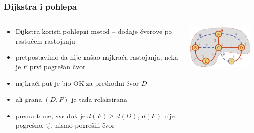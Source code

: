 \documentclass[compress]{beamer}
\begin{document}
\begin{frame}[fragile]
  \frametitle{Dijkstra i pohlepa}
  \begin{columns}
    \begin{column}[t]{7cm}
      \begin{itemize}
        \item Dijkstra koristi pohlepni metod -- dodaje čvorove po 
          rastućem rastojanju
        \item pretpostavimo da nije našao najkraća rastojanja; neka je 
          $F$ prvi pogrešan čvor
        \item najkraći put je bio OK za prethodni čvor $D$
        \item ali grana $(D,F)$ je tada relaksirana
        \item prema tome, sve dok je $d(F)\geq d(D)$, $d(F)$ nije
          pogrešno, tj. nismo pogrešili čvor
      \end{itemize}
    \end{column}
    \begin{column}[t]{5cm}
      \begin{center}
        \includegraphics[width=5cm]{asp-14-pic64.png}
      \end{center}
    \end{column}
  \end{columns}
\end{frame}
\end{document}
